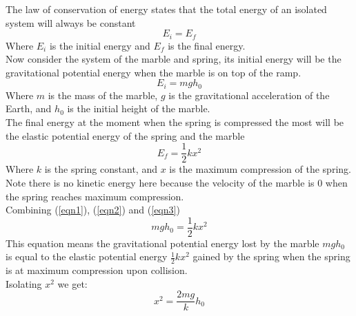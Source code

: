 The law of conservation of energy states that the total energy of an isolated system will always be constant
\begin{equation}
    E_i=E_f \label{eqn1}
\end{equation}
Where $E_i$ is the initial energy and $E_f$ is the final energy.\\
Now consider the system of the marble and spring, its initial energy will be the gravitational potential energy when the marble is on top of the ramp.
\begin{equation}
    E_i=mgh_0 \label{eqn2}
\end{equation}
Where $m$ is the mass of the marble, $g$ is the gravitational acceleration of the Earth, and $h_0$ is the initial height of the marble.\\
The final energy at the moment when the spring is compressed the most will be the elastic potential energy of the spring and the marble
\begin{equation}
    E_f=\frac{1}{2}kx^2 \label{eqn3}
\end{equation}
Where $k$ is the spring constant, and $x$ is the maximum compression of the spring.\\
Note there is no kinetic energy here because the velocity of the marble is 0 when the spring reaches maximum compression.\\
Combining (\ref{eqn1}), (\ref{eqn2}) and (\ref{eqn3})
\begin{equation}
    mgh_0=\frac{1}{2}kx^2
\end{equation}
This equation means the gravitational potential energy lost by the marble $mgh_0$ is equal to the elastic potential energy $\frac{1}{2}kx^2$ gained by the spring when the spring is at maximum compression upon collision. \\
Isolating $x^2$ we get:
\begin{equation}
    x^2=\frac{2mg}{k}h_0
\end{equation}